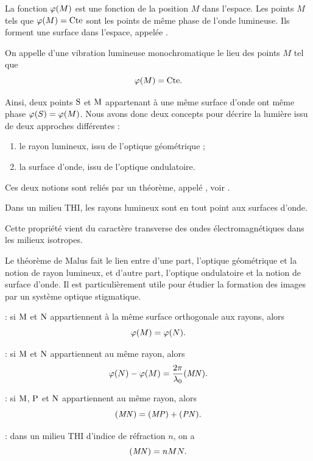 \documentclass[12pt,fancy]{cours}
\begin{document}
%
%
%

     La fonction $\varphi(M)$ est une fonction de la position $M$ dans l'espace. Les points $M$ tels que $\varphi(M) = \text{Cte}$ sont les points de même phase de l'onde lumineuse. Ils forment une surface dans l'espace, appelée .

\begin{definition}\label{def:}
On appelle  d’une vibration lumineuse monochromatique le lieu des points $M$ tel que
\begin{equation*}
\varphi(M) =\text{Cte}.
\end{equation*}

\end{definition}
\noindent
Ainsi, deux points $\rm S$ et $\rm M$ appartenant à une même surface d’onde ont même phase $\varphi(S) = \varphi(M)$. Nous avons donc deux concepts pour décrire la lumière issu de deux approches différentes :
\begin{enumerate}
  \item le rayon lumineux, issu de l'optique géométrique ;
  \item la surface d'onde, issu de l'optique ondulatoire.
\end{enumerate}
Ces deux notions sont reliés par un théorème, appelé , voir .
\begin{prop}\label{form:malus}
Dans un milieu THI, les rayons lumineux sont en tout point  aux surfaces d'onde.
\end{prop}
\begin{remarque}
  Cette propriété vient du caractère transverse des ondes électromagnétiques dans les milieux isotropes.
\end{remarque}
\noindent Le théorème de Malus fait le lien entre d'une part, l'optique géométrique et la notion de rayon lumineux, et d'autre part, l'optique ondulatoire et la notion de surface d'onde. Il est particulièrement utile pour étudier la formation des images par un système optique stigmatique.
\begin{methode}
  \item	{} : si $\rm M$ et $\rm N$ appartiennent à la même surface orthogonale aux rayons, alors $$\varphi(M) = \varphi(N).$$
  \item {} : si $\rm M$ et $\rm N$ appartiennent au même rayon, alors 
  $$\varphi(N) - \varphi(M) = \frac{2\pi}{\lambda_0}\mathit{(MN)}.$$
  \item {} : si $\rm M$, $\rm P$ et $\rm N$ appartiennent au même rayon, alors 
   $$\mathit{(MN)} = \mathit{(MP)} + \mathit{(PN)}.$$
   \item {} : dans un milieu THI d'indice de réfraction $n$, on a 
   $$\mathit{(MN)} = n MN.$$
\end{methode}
\end{document}
